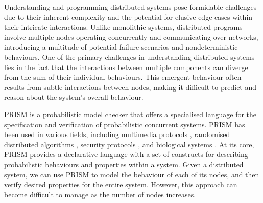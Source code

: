 Understanding and programming distributed systems pose formidable
challenges due to their inherent complexity and the potential for
elusive edge cases
within their intricate interactions. Unlike monolithic systems,
distributed programs involve multiple nodes operating concurrently and
communicating over networks, introducing a multitude of potential
failure scenarios and nondeterministic behaviours.
%
One of the primary challenges in understanding distributed systems
lies in the fact that the interactions between multiple components can
diverge from the sum of their individual behaviours. This emergent
behaviour often results from subtle interactions between nodes, making
it difficult to predict and reason about the system's overall
behaviour.

PRISM \cite{PRISMdoc} is a probabilistic model checker that offers a
specialised language for the specification and verification of
probabilistic concurrent systems. PRISM has been used in various
fields, including multimedia protocols \cite{multimedia}, randomised
distributed algorithms \cite{distr1,distr2}, security protocols
\cite{security1,security2}, and biological systems \cite{bio1,bio2}.
At its core, PRISM provides a declarative language with a set of
constructs for describing probabilistic behaviours and properties
within a system.
%
Given a distributed system, we can use PRISM to model the behaviour of
each of its nodes,
and then verify desired properties for the entire system. However,
this approach can become difficult to manage as the number of nodes
increases.

%

